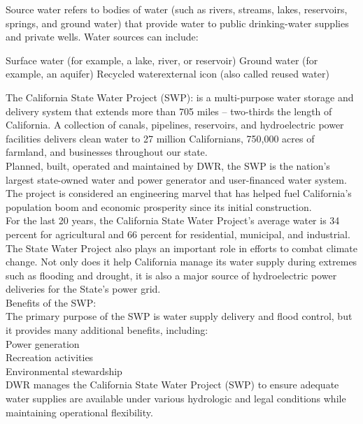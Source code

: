 \documentclass{article}
\begin{document}
Source water refers to bodies of water (such as rivers, streams, lakes, reservoirs, springs, and ground water) that provide water to public drinking-water supplies and private wells. Water sources can include:

Surface water (for example, a lake, river, or reservoir)
Ground water (for example, an aquifer)
Recycled waterexternal icon (also called reused water)

The California State Water Project (SWP):
 is a multi-purpose water storage and delivery system that extends more than 705 miles -- two-thirds the length of California. A collection of canals, pipelines, reservoirs, and hydroelectric power facilities delivers clean water to 27 million Californians, 750,000 acres of farmland, and businesses throughout our state.\\

Planned, built, operated and maintained by DWR, the SWP is the nation’s largest state-owned water and power generator and user-financed water system. The project is considered an engineering marvel that has helped fuel California’s population boom and economic prosperity since its initial construction.\\

For the last 20 years, the California State Water Project’s average water is 34 percent for agricultural and 66 percent for residential, municipal, and industrial.\\

The State Water Project also plays an important role in efforts to combat climate change. Not only does it help California manage its water supply during extremes such as flooding and drought, it is also a major source of hydroelectric power deliveries for the State's power grid.\\

Benefits of the SWP:\\
The primary purpose of the SWP is water supply delivery and flood control, but it provides many additional benefits, including:\\

Power generation\\
Recreation activities\\
Environmental stewardship\\

DWR manages the California State Water Project (SWP) to ensure adequate water supplies are available under various hydrologic and legal conditions while maintaining operational flexibility. \\
\end{document}
